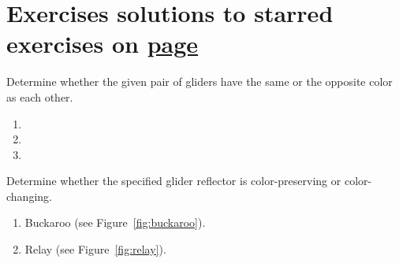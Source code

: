 \section*{Exercises \hfill \normalfont\textsf{\small solutions to starred exercises on \hyperlink{solutions_spaceships}{page \pageref{solutions_spaceships}}}}
\label{sec:spaceships_exercises}
\vspace*{-0.4cm}\hrulefill\vspace*{-0.3cm}\footnotesize\begin{multicols}{2}\vspace*{-0.4cm}\raggedcolumns{}
	\setlength{\parskip}{0pt}\ifdefined\FORPRINTING{}\else%
\fi
	
	\begin{problemstar}\label{exer:glider_color} 
		Determine whether the given pair of gliders have the same or the opposite color as each other.\vspace*{-0.25cm}
		
		\begin{multicols}{2}
			\begin{enumerate}
				\item[\bf\color{ocre}(a)] 
				
				\item[\bf\color{ocre}(c)] 
				
				\item[\bf\color{ocre}(b)] 
			\end{enumerate}
		\end{multicols}
	\end{problemstar}
	
	
	\mfilbreak
	
	
	\begin{problemstar}\label{exer:reflector_color} 
		Determine whether the specified glider reflector is color-preserving or color-changing.\smallskip
		
		\begin{enumerate}[label=\bf\color{ocre}(\alph*)]
			\item Buckaroo (see Figure~\ref{fig:buckaroo}).
			
			\item Relay (see Figure~\ref{fig:relay}).
			

\end{enumerate}
\end{problemstar}
\end{multicols}
